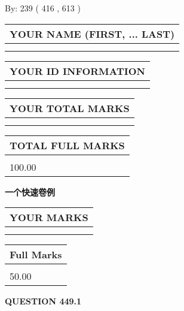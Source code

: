 \documentclass{ctexart}
\begin{document}
   
\hspace{1.0in} By: 
 239 ( 416 ,  613 )
   
   
   
   
\newpage 
\setcounter{page}{ 
   449001 } 
   
   
   
   
\noindent\begin{tabular}{|l|}
\hline
YOUR NAME (FIRST, ... LAST)  \\
\hline
 \\ 
 \\ 
\hline
\end{tabular}
\hspace{0.05in} \begin{tabular}{|l|}
\hline
 YOUR   ID   INFORMATION  \\
\hline
 \\ 
 \\ 
\hline
\end{tabular}
   
   
\vspace{0.2in}\noindent\begin{tabular}{|l|}
\hline
YOUR TOTAL MARKS  \\
\hline
 \\ 
 \\ 
\hline
\end{tabular}
\hspace{0.05in} \begin{tabular}{|l|}
\hline
TOTAL FULL MARKS  \\
\hline
 \\ 
100.00 \\
\hline
\end{tabular}
   
   
 \vspace{0.2in}
{\LARGE {\textbf{ 一个快速卷例}}}
   
   
  
\vspace{0.2in}
  
\noindent\begin{tabular}{|l|}
\hline
 YOUR MARKS  \\
\hline
 \\ 
 \\ 
\hline
\end{tabular}
\hspace{0.05in} \begin{tabular}{|l|}
\hline
 Full Marks  \\
\hline
 \\ 
50.00 \\
\hline
\end{tabular}
{\textbf{\Large{QUESTION
449.1 
}}}
  
\end{document}
